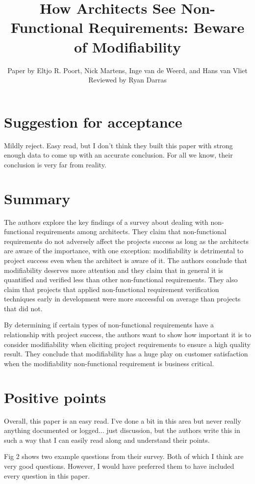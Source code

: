 \documentclass[11pt,twoside]{IEEEtran}
\title{How Architects See Non-Functional Requirements: Beware of Modifiability}
\author{Paper by Eltjo R. Poort, Nick Martens, Inge van de Weerd, and Hans van Vliet\\Reviewed by Ryan Darras}
\begin{document}
\maketitle

\section{Suggestion for acceptance}
Mildly reject. Easy read, but I don't think they built this paper with strong enough data to come up with an accurate conclusion. For all we know, their conclusion is very far from reality.

\section{Summary}
The authors explore the key findings of a survey about dealing with non-functional requirements among architects. They claim that non-functional requirements do not adversely affect the projects success as long as the architects are aware of the importance, with one exception: modifiability is detrimental to project success even when the architect is aware of it. The authors conclude that  modifiability deserves more attention and they claim that in general it is quantified and verified less than other non-functional requirements. They also claim that projects that applied non-functional requirement verification techniques early in development were more successful on average than projects that did not.

By determining if certain types of non-functional requirements have a relationship with project success, the authors want to show how important it is to consider modifiability when eliciting project requirements to ensure a high quality result. They conclude that modifiability has a huge play on customer satisfaction when the modifiability non-functional requirement is business critical.

\section{Positive points}
Overall, this paper is an easy read. I've done a bit in this area but never really anything documented or logged... just discussion, but the authors write this in such a way that I can easily read along and understand their points.

Fig 2 shows two example questions from their survey. Both of which I think are very good questions. However, I would have preferred them to have included every question in this paper.
\end{document}
